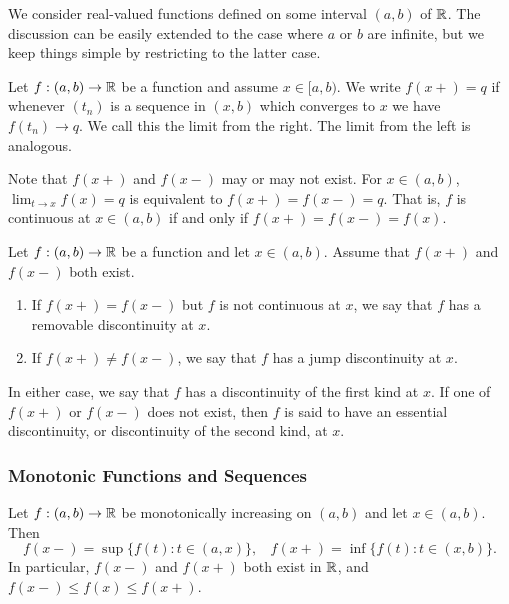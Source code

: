 \documentclass[12pt]{article} %
\begin{document}
We consider real-valued functions defined on some interval $(a, b)$ of $\mathbb{R}$. The discussion can be easily extended to the case where $a$ or $b$ are infinite, but we keep things simple by restricting to the latter case.

\begin{definition}
    Let $f : (a, b) \to \mathbb{R}$ be a function and assume $x \in [a, b)$. We write $f(x+) = q$ if whenever $(t_n)$ is a sequence in $(x, b)$ which converges to $x$ we have $f(t_n) \to q$. We call this the limit from the right. The limit from the left is analogous.
\end{definition}

\begin{remark}
    Note that $f(x+)$ and $f(x-)$ may or may not exist. For $x \in (a, b)$, $\lim_{t \to x} f(x) = q$ is equivalent to $f(x+) = f(x-) = q$. That is, $f$ is continuous at $x \in (a,b)$ if and only if ${f(x+) = f(x-) = f(x)}$.
\end{remark}

\begin{definition}
    Let $f : (a, b) \to \mathbb{R}$ be a function and let $x \in (a,b)$. Assume that $f(x+)$ and $f(x-)$ both exist. \begin{enumerate}
        \item If $f(x+) = f(x-)$ but $f$ is not continuous at $x$, we say that $f$ has a removable discontinuity at $x$.
        \item If $f(x+) \neq f(x-)$, we say that $f$ has a jump discontinuity at $x$.
    \end{enumerate} In either case, we say that $f$ has a discontinuity of the first kind at $x$. If one of $f(x+)$ or $f(x-)$ does not exist, then $f$ is said to have an essential discontinuity, or discontinuity of the second kind, at $x$.
\end{definition}

\subsubsection{Monotonic Functions and Sequences}

\begin{theorem}
    Let $f : (a, b) \to \mathbb{R}$ be monotonically increasing on $(a, b)$ and let $x \in (a, b)$. Then \[f(x-) = \sup\{f(t) : t \in (a, x)\}, \ \ \ \ f(x+) = \inf\{f(t) : t \in (x, b)\}.\] In particular, $f(x-)$ and $f(x+)$ both exist in $\mathbb{R}$, and $f(x-) \leq f(x) \leq f(x+)$.
\end{theorem}
\end{document}
